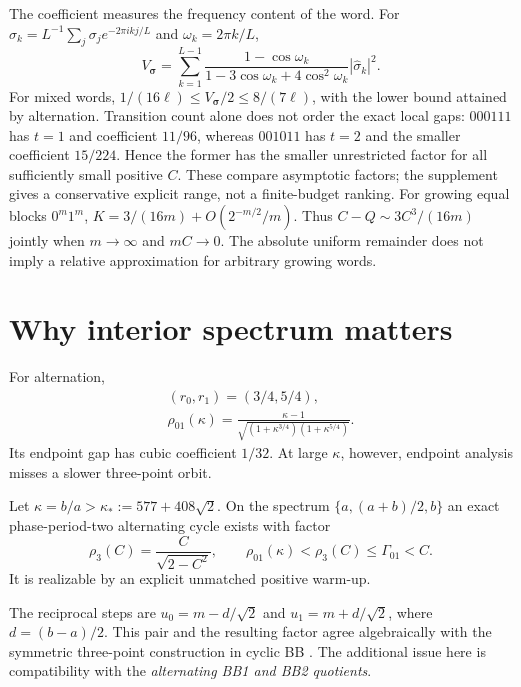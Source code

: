 \documentclass[letterpaper,twoside]{article}
\begin{document}
The coefficient measures the frequency content of the word. For
$\widehat\sigma_k=L^{-1}\sum_j\sigma_j e^{-2\pi i kj/L}$ and $\omega_k=2\pi k/L$,
\begin{equation}\label{eq:fourier-main}
 V_{\bm\sigma}=\sum_{k=1}^{L-1}
 \frac{1-\cos\omega_k}{1-3\cos\omega_k+4\cos^2\omega_k}
 |\widehat\sigma_k|^2.
\end{equation}
For mixed words, $1/(16\ell)\le V_{\bm\sigma}/2\le8/(7\ell)$, with the lower bound attained by alternation. Transition count alone does not order the exact local gaps: $000111$ has $t=1$ and coefficient $11/96$, whereas $001011$ has $t=2$ and the smaller coefficient $15/224$. Hence the former has the smaller unrestricted factor for all sufficiently small positive $C$. These compare asymptotic factors; the supplement gives a conservative explicit range, not a finite-budget ranking. For growing equal blocks $0^m1^m$, $K=3/(16m)+O(2^{-m/2}/m)$. Thus $C-Q\sim3C^3/(16m)$ jointly when $m\to\infty$ and $mC\to0$. The absolute uniform remainder does not imply a relative approximation for arbitrary growing words.

\section{Why interior spectrum matters}\label{sec:interior}
For alternation,
\[
\begin{gathered}(r_0,r_1)=(3/4,5/4),\\
 \rho_{01}(\kappa)=
 \frac{\kappa-1}{\sqrt{(1+\kappa^{3/4})(1+\kappa^{5/4})}}.
\end{gathered}
\]
Its endpoint gap has cubic coefficient $1/32$. At large $\kappa$, however, endpoint analysis misses a slower three-point orbit.

\begin{theorem}\label{thm:three}
Let $\kappa=b/a>\kappa_*:=577+408\sqrt2$. On the spectrum $\{a,(a+b)/2,b\}$ an exact phase-period-two alternating cycle exists with factor
\[
 \rho_3(C)=\frac{C}{\sqrt{2-C^2}},\qquad
 \rho_{01}(\kappa)<\rho_3(C)\le\Gamma_{01}<C.
\]
It is realizable by an explicit unmatched positive warm-up.
\end{theorem}

The reciprocal steps are $u_0=m-d/\sqrt2$ and $u_1=m+d/\sqrt2$, where $d=(b-a)/2$. This pair and the resulting factor agree algebraically with the symmetric three-point construction in cyclic BB \cite[eqs.~(3.21)--(3.23)]{DaiHagerSchittkowskiZhang2006}. The additional issue here is compatibility with the \emph{alternating BB1 and BB2 quotients}.
\end{document}
